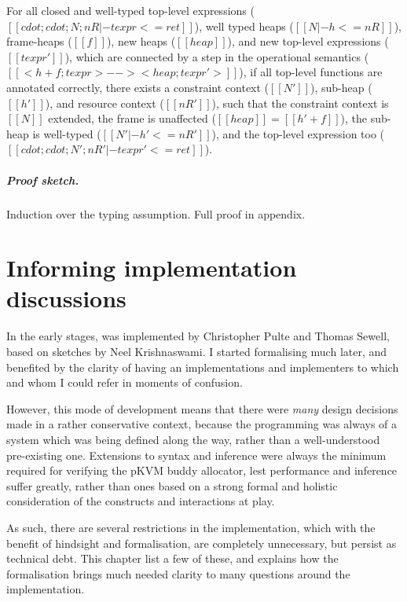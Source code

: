 \begin{theorem}
For all closed and well-typed top-level expressions
($[[ cdot ; cdot ; N ; nR |- texpr <= ret ]]$),
well typed heaps ($[[ N |- h <= nR ]]$),
frame-heaps ($[[ f ]]$),
new heaps ($[[ heap ]]$),
and new top-level expressions ($[[ texpr' ]]$),
which are connected by a step in the operational semantics
($[[ < h + f ; texpr > -->  < heap ; texpr' > ]]$),
if all top-level functions are annotated correctly,
there exists a constraint context ($[[ N' ]]$),
sub-heap ($[[ h' ]]$),
and resource context ($[[ nR' ]]$),
such that the constraint context is $[[ N ]]$ extended,
the frame is unaffected ($[[ heap ]] = [[ h' + f ]]$),
the sub-heap is well-typed ($[[ N' |- h' <= nR' ]]$),
and the top-level expression too
($[[ cdot ; cdot ; N' ; nR' |- texpr' <= ret ]]$).
\end{theorem}

\paragraph{Proof sketch.} Induction over the typing assumption. Full proof in
appendix.

\chapter{Informing implementation discussions}\label{chap:inform-impl}

In the early stages,  was implemented by Christopher Pulte and Thomas
Sewell, based on sketches by Neel Krishnaswami. I started formalising
 much later, and benefited by the clarity of having an
implementations and implementers to which and whom I could refer in moments of
confusion.

However, this mode of development means that there were \emph{many} design
decisions made in a rather conservative context, because the programming was
always of a system which was being defined along the way, rather than a
well-understood pre-existing one. Extensions to syntax and inference were
always the minimum required for verifying the pKVM buddy allocator, lest
performance and inference suffer greatly, rather than ones based on a strong
formal and holistic consideration of the constructs and interactions at play.

As such, there are several restrictions in the implementation, which with the
benefit of hindsight and formalisation, are completely unnecessary, but persist
as technical debt. This chapter list a few of these, and explains how the
formalisation brings much needed clarity to many questions around the
implementation.

